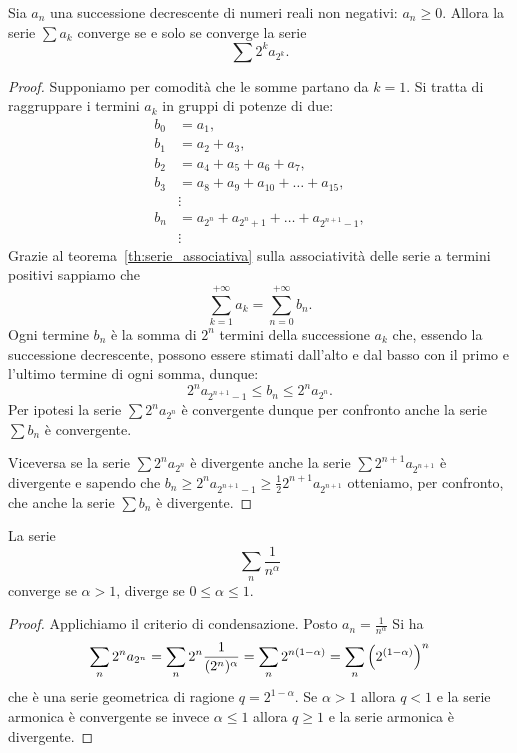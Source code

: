 \begin{theorem}%
\mymark{**}%
%
%
Sia $a_n$ una successione decrescente di numeri reali non negativi:
$a_n \ge 0$.
Allora la serie $\sum a_k$ converge se e solo se converge
la serie
\[
  \sum 2^k a_{2^k}.
\]
\end{theorem}
%
\begin{proof}
\mymark{**}
Supponiamo per comodità che le somme partano da $k=1$.
Si tratta di raggruppare i termini $a_k$ in gruppi di potenze di due:
\begin{align*}
  b_0 & = a_1, \\
  b_1 &= a_2 +  a_3, \\
  b_2 &= a_4 +  a_5 +  a_6 +  a_7, \\
  b_3 &= a_8 +  a_9 +  a_{10} + \dots + a_{15}, \\
  &\vdots\\
  b_n &= a_{2^n} +  a_{2^{n}+1} + \dots + a_{2^{n+1}-1},\\
  &\vdots
\end{align*}
Grazie al teorema~\ref{th:serie_associativa} sulla associatività
delle serie a termini positivi sappiamo che
  \[
  \sum_{k=1}^{+\infty} a_k = \sum_{n=0}^{+\infty} b_n.
  \]
Ogni termine $b_n$ è la somma di $2^n$ termini della
successione $a_k$ che, essendo la successione decrescente,
possono essere stimati dall'alto e dal basso con il primo
e l'ultimo termine di ogni somma, dunque:
\[
  2^n a_{2^{n+1}-1} \le b_n \le 2^n a_{2^{n}}.
\]
Per ipotesi la serie $\sum 2^n a_{2^n}$ è convergente
dunque per confronto anche la serie $\sum b_n$ è convergente.

Viceversa se la serie $\sum 2^n a_{2^n}$ è divergente
anche la serie $\sum 2^{n+1} a_{2^{n+1}}$ è divergente
e sapendo che $b_n\ge 2^n a_{2^{n+1}-1}\ge \frac 1 2 2^{n+1} a_{2^{n+1}}$
otteniamo, per confronto, che anche la serie $\sum b_n$ è divergente.
\end{proof}

\begin{corollary}
\mymark{***}
%
La serie
\[
 \sum_n \frac{1}{n^\alpha}
\]
converge se $\alpha>1$,
diverge se $0\le \alpha\le 1$.
\end{corollary}
%
\begin{proof}
\mymark{***}
Applichiamo il criterio di condensazione. Posto $a_n = \frac 1{n^\alpha}$ Si ha
\[
  \sum_n 2^n a_{2^n} = \sum_n 2^n \frac{1}{(2^n)^\alpha}
  = \sum_n 2^{n(1-\alpha)}
  = \sum_n {\left( 2^{(1-\alpha)} \right)}^n
\]
che è una serie geometrica di ragione $q=2^{1-\alpha}$.
Se $\alpha>1$ allora $q<1$ e la serie armonica è convergente
se invece $\alpha \le 1$ allora $q\ge 1$ e la serie
armonica è divergente.
\end{proof}

